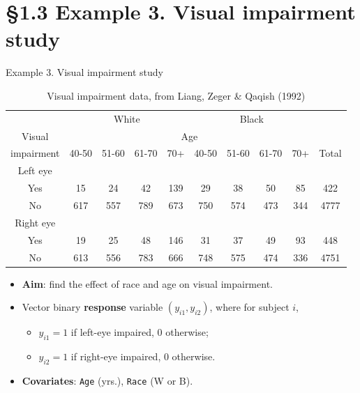 \documentclass{beamer}
\newcommand{\currentsection}{}
\let\oldsection\section
\renewcommand{\section}[1]{\oldsection{#1}\renewcommand{\currentsection}{#1}}
\begin{document}
\section{\S1.3 Example 3. Visual impairment study}\label{sec:Ex3}
%
%
\begin{frame}{Example 3. Visual impairment study}
\begin{table} [!htbp]
\caption{Visual impairment data, from Liang, Zeger \& Qaqish (1992) \label{tab1.3}}
\begin{center}
\begin{scriptsize}
\begin{tabular}{|c|cccc|cccc|c|}
\hline
& \multicolumn{4}{c}{White} & \multicolumn{4}{c|}{Black} & \\
Visual &\multicolumn{8}{c|}{Age} & \\
impairment & 40-50 & 51-60 & 61-70 & 70+ & 40-50
 & 51-60 & 61-70 & 70+ & Total \\ \hline
Left eye & &&&&&&&& \\
Yes & 15 & 24 & 42 & 139 & 29 & 38 & 50 & 85 & 422 \\
No & 617 & 557 & 789 & 673 & 750 & 574 & 473 & 344 & 4777 \\ \hline
Right eye & &&&&&&&& \\
Yes & 19 & 25 & 48 & 146 & 31 & 37 & 49 & 93 & 448 \\
No & 613 & 556 & 783 & 666 & 748 & 575 & 474 & 336 & 4751 \\ \hline
\end{tabular}
\end{scriptsize}
\end{center}
\end{table}
\begin{itemize} 
\item 
\textbf{Aim}: find the effect of race and age on visual impairment.
\item
Vector binary \textbf{response} variable $(y_{i1}, y_{i2})$, where for subject $i$,
\begin{itemize}
\item
$y_{i1}=1$ if left-eye impaired, 0 otherwise;
\item
 $y_{i2}=1$ if right-eye impaired, 0 otherwise. 
 \end{itemize}
 \item
\textbf{Covariates}: \texttt{Age} (yrs.), \texttt{Race} (W or B).


\end{itemize}
\end{frame}
\end{document}
